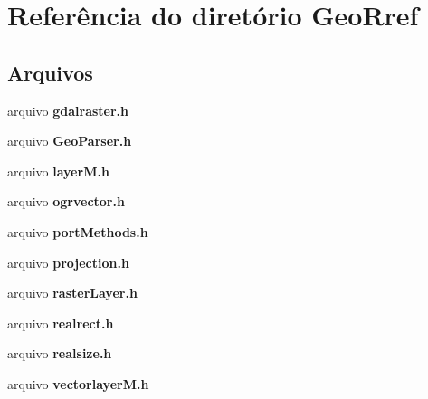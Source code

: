 \section{Referência do diretório Geo\+Rref}
\label{dir_f08af902317b52333383d11e32857ccf}
\subsection*{Arquivos}
\begin{DoxyCompactItemize}
\item 
arquivo {\bf gdalraster.\+h}
\item 
arquivo {\bf Geo\+Parser.\+h}
\item 
arquivo {\bf layer\+M.\+h}
\item 
arquivo {\bf ogrvector.\+h}
\item 
arquivo {\bf port\+Methods.\+h}
\item 
arquivo {\bf projection.\+h}
\item 
arquivo {\bf raster\+Layer.\+h}
\item 
arquivo {\bf realrect.\+h}
\item 
arquivo {\bf realsize.\+h}
\item 
arquivo {\bf vectorlayer\+M.\+h}
\end{DoxyCompactItemize}
